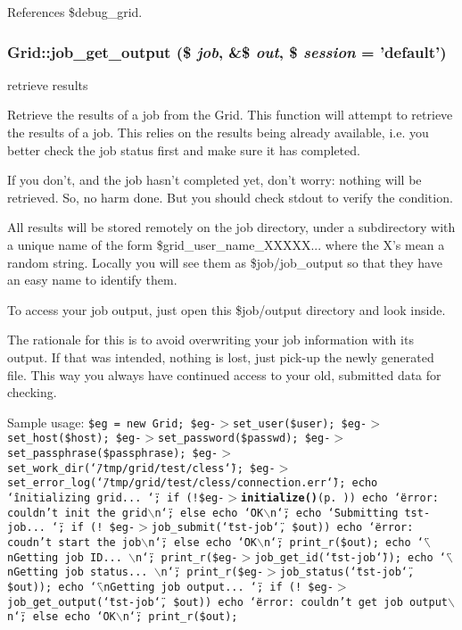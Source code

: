 References \$debug\_\-grid.
\subsubsection{\setlength{\rightskip}{0pt plus 5cm}Grid::job\_\-get\_\-output (\$ {\em job}, \&\$ {\em out}, \$ {\em session} = 'default')}\label{classGrid_a24}


retrieve results 

Retrieve the results of a job from the Grid. This function will attempt to retrieve the results of a job. This relies on the results being already available, i.e. you better check the job status first and make sure it has completed.

If you don't, and the job hasn't completed yet, don't worry: nothing will be retrieved. So, no harm done. But you should check stdout to verify the condition.

All results will be stored remotely on the job directory, under a subdirectory with a unique name of the form \$grid\_\-user\_\-name\_\-XXXXX... where the X's mean a random string. Locally you will see them as \$job/job\_\-output so that they have an easy name to identify them.

To access your job output, just open this \$job/output directory and look inside.

The rationale for this is to avoid overwriting your job information with its output. If that was intended, nothing is lost, just pick-up the newly generated file. This way you always have continued access to your old, submitted data for checking.

Sample usage: {\tt  \$eg = new Grid; \$eg-$>$set\_\-user(\$user); \$eg-$>$set\_\-host(\$host); \$eg-$>$set\_\-password(\$passwd); \$eg-$>$set\_\-passphrase(\$passphrase); \$eg-$>$set\_\-work\_\-dir(\char`\"{}/tmp/grid/test/cless\char`\"{}); \$eg-$>$set\_\-error\_\-log(\char`\"{}/tmp/grid/test/cless/connection.err\char`\"{}); echo \char`\"{}initializing grid... \char`\"{}; if (!\$eg-$>${\bf initialize()}{\rm (p.\,\pageref{classGrid_a11})}) echo \char`\"{}error: couldn't init the grid$\backslash$n\char`\"{}; else echo \char`\"{}OK$\backslash$n\char`\"{}; echo \char`\"{}Submitting tst-job... \char`\"{}; if (! \$eg-$>$job\_\-submit(\char`\"{}tst-job\char`\"{}, \$out)) echo \char`\"{}error: coudn't start the job$\backslash$n\char`\"{}; else echo \char`\"{}OK$\backslash$n\char`\"{}; print\_\-r(\$out); echo \char`\"{}$\backslash$n\-Getting job ID... $\backslash$n\char`\"{}; print\_\-r(\$eg-$>$job\_\-get\_\-id(\char`\"{}tst-job\char`\"{})); echo \char`\"{}$\backslash$n\-Getting job status... $\backslash$n\char`\"{}; print\_\-r(\$eg-$>$job\_\-status(\char`\"{}tst-job\char`\"{}, \$out)); echo \char`\"{}$\backslash$n\-Getting job output... \char`\"{}; if (! \$eg-$>$job\_\-get\_\-output(\char`\"{}tst-job\char`\"{}, \$out)) echo \char`\"{}error: couldn't get job output$\backslash$n\char`\"{}; else echo \char`\"{}OK$\backslash$n\char`\"{}; print\_\-r(\$out); }


